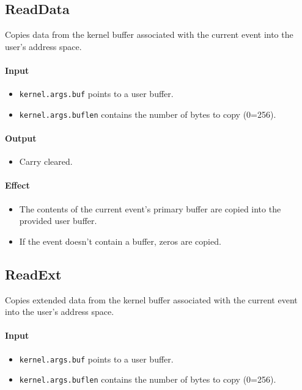 \subsection*{ReadData}
Copies data from the kernel buffer associated with the current event into the user's address space.

\paragraph{Input}

\begin{itemize}
\item \verb+kernel.args.buf+ points to a user buffer.
\item \verb+kernel.args.buflen+ contains the number of bytes to copy (0=256).
\end{itemize}

\paragraph{Output}

\begin{itemize}
\item Carry cleared.
\end{itemize}

\paragraph{Effect}

\begin{itemize}
\item The contents of the current event's primary buffer are copied into the provided user buffer.
\item If the event doesn't contain a buffer, zeros are copied.
\end{itemize}

\subsection*{ReadExt}
Copies extended data from the kernel buffer associated with the current event into the user's address space.

\paragraph{Input}

\begin{itemize} 
\item \verb+kernel.args.buf+ points to a user buffer.
\item \verb+kernel.args.buflen+ contains the number of bytes to copy (0=256).
\end{itemize}

